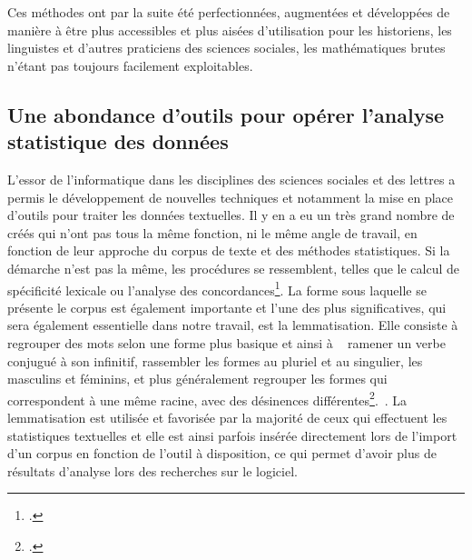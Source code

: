 Ces méthodes ont par la suite été perfectionnées, augmentées et développées de manière à être plus accessibles et plus aisées d'utilisation pour les historiens, les linguistes et d'autres praticiens des sciences sociales, les mathématiques brutes n'étant pas toujours facilement exploitables.

\subsection{Une abondance d'outils pour opérer l'analyse statistique des données}
L'essor de l'informatique dans les disciplines des sciences sociales et des lettres a permis le développement de nouvelles techniques et notamment la mise en place d'outils pour traiter les données textuelles. Il y en a eu un très grand nombre de créés qui n'ont pas tous la même fonction, ni le même angle de travail, en fonction de leur approche du corpus de texte et des méthodes statistiques. Si la démarche n’est pas la même, les procédures se ressemblent, telles que le calcul de spécificité lexicale ou l’analyse des concordances\footcite[p.~33-36]{stat_text_garnier}. La forme sous laquelle se présente le corpus est également importante et l’une des plus significatives, qui sera également essentielle dans notre travail, est la lemmatisation. Elle consiste à regrouper des mots selon une forme plus basique et ainsi à \og~ ramener un verbe conjugué à son infinitif, rassembler les formes au pluriel et au singulier, les masculins et féminins, et plus généralement regrouper les formes qui correspondent à une même racine, avec des désinences différentes\footcite[p.~867]{stat_text_guerin}.~\fg{}. La lemmatisation est utilisée et favorisée par la majorité de ceux qui effectuent les statistiques textuelles et elle est ainsi parfois insérée directement lors de l'import d'un corpus en fonction de l'outil à disposition, ce qui permet d'avoir plus de résultats d'analyse lors des recherches sur le logiciel.

